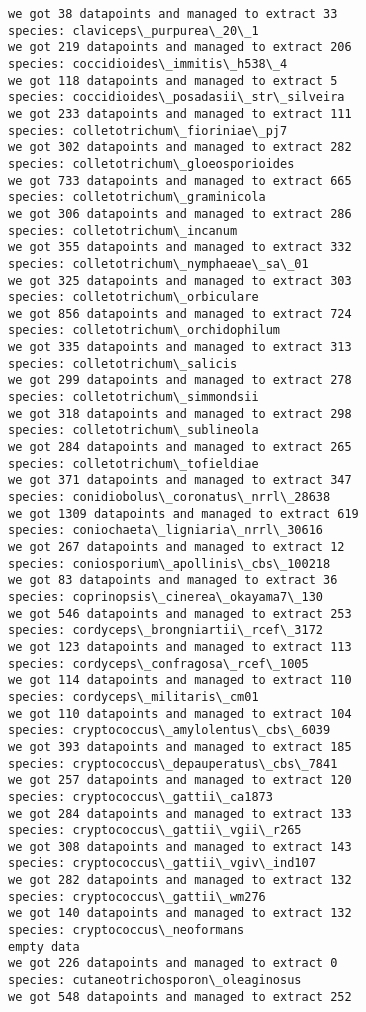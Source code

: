 \documentclass[11pt]{article}
\begin{document}
\begin{Verbatim}[commandchars=\\\{\}]
we got 38 datapoints and managed to extract 33
species: claviceps\_purpurea\_20\_1
we got 219 datapoints and managed to extract 206
species: coccidioides\_immitis\_h538\_4
we got 118 datapoints and managed to extract 5
species: coccidioides\_posadasii\_str\_silveira
we got 233 datapoints and managed to extract 111
species: colletotrichum\_fioriniae\_pj7
we got 302 datapoints and managed to extract 282
species: colletotrichum\_gloeosporioides
we got 733 datapoints and managed to extract 665
species: colletotrichum\_graminicola
we got 306 datapoints and managed to extract 286
species: colletotrichum\_incanum
we got 355 datapoints and managed to extract 332
species: colletotrichum\_nymphaeae\_sa\_01
we got 325 datapoints and managed to extract 303
species: colletotrichum\_orbiculare
we got 856 datapoints and managed to extract 724
species: colletotrichum\_orchidophilum
we got 335 datapoints and managed to extract 313
species: colletotrichum\_salicis
we got 299 datapoints and managed to extract 278
species: colletotrichum\_simmondsii
we got 318 datapoints and managed to extract 298
species: colletotrichum\_sublineola
we got 284 datapoints and managed to extract 265
species: colletotrichum\_tofieldiae
we got 371 datapoints and managed to extract 347
species: conidiobolus\_coronatus\_nrrl\_28638
we got 1309 datapoints and managed to extract 619
species: coniochaeta\_ligniaria\_nrrl\_30616
we got 267 datapoints and managed to extract 12
species: coniosporium\_apollinis\_cbs\_100218
we got 83 datapoints and managed to extract 36
species: coprinopsis\_cinerea\_okayama7\_130
we got 546 datapoints and managed to extract 253
species: cordyceps\_brongniartii\_rcef\_3172
we got 123 datapoints and managed to extract 113
species: cordyceps\_confragosa\_rcef\_1005
we got 114 datapoints and managed to extract 110
species: cordyceps\_militaris\_cm01
we got 110 datapoints and managed to extract 104
species: cryptococcus\_amylolentus\_cbs\_6039
we got 393 datapoints and managed to extract 185
species: cryptococcus\_depauperatus\_cbs\_7841
we got 257 datapoints and managed to extract 120
species: cryptococcus\_gattii\_ca1873
we got 284 datapoints and managed to extract 133
species: cryptococcus\_gattii\_vgii\_r265
we got 308 datapoints and managed to extract 143
species: cryptococcus\_gattii\_vgiv\_ind107
we got 282 datapoints and managed to extract 132
species: cryptococcus\_gattii\_wm276
we got 140 datapoints and managed to extract 132
species: cryptococcus\_neoformans
empty data
we got 226 datapoints and managed to extract 0
species: cutaneotrichosporon\_oleaginosus
we got 548 datapoints and managed to extract 252

\end{Verbatim}
\end{document}
